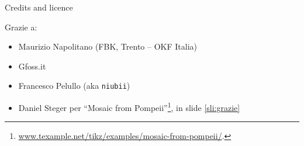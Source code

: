 \documentclass[xcolor=svgnames]{beamer}
\begin{document}

	\begin{frame}{Credits and licence}
		\begin{center}
			\Huge{\ccbyncsa}
		\end{center}
		\vfill
		Grazie a:
		\begin{itemize}
			\item Maurizio Napolitano (FBK, Trento -- OKF Italia)
			\item Gfoss.it
			\item Francesco Pelullo (aka \texttt{niubii})
			\item Daniel Steger per ``Mosaic from Pompeii''\footnote{\url{www.texample.net/tikz/examples/mosaic-from-pompeii/}.}, in slide \ref{sli:grazie}
		\end{itemize}
	\end{frame}
\end{document}
